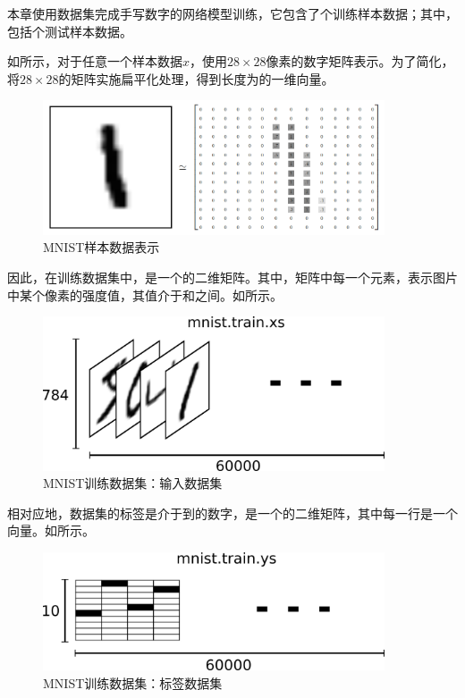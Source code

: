 \begin{content}

本章使用数据集完成手写数字的网络模型训练，它包含了个训练样本数据；其中，包括个测试样本数据。

如所示，对于任意一个样本数据$x$，使用$28 \times 28$像素的数字矩阵表示。为了简化，将$28 \times 28$的矩阵实施扁平化处理，得到长度为的一维向量。

\begin{figure}[H]
\centering
\includegraphics[width=0.9\textwidth]{figures/mnist-x.png}
\caption{MNIST样本数据表示}
 \label{fig:mnist-x}
\end{figure}

因此，在训练数据集中，是一个\code{[60000, 784]}的二维矩阵。其中，矩阵中每一个元素，表示图片中某个像素的强度值，其值介于和之间。如所示。

\begin{figure}[H]
\centering
\includegraphics[width=0.9\textwidth]{figures/mnist-train-xs.png}
\caption{MNIST训练数据集：输入数据集}
 \label{fig:mnist-train-xs}
\end{figure}

相对应地，数据集的标签是介于到的数字，是一个\code{[60000, 10]}的二维矩阵，其中每一行是一个向量。如所示。

\begin{figure}[H]
\centering
\includegraphics[width=0.9\textwidth]{figures/mnist-train-ys.png}
\caption{MNIST训练数据集：标签数据集}
 \label{fig:mnist-train-ys}
\end{figure}

\end{content}


